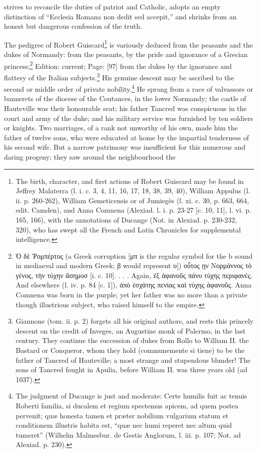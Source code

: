 {strives to reconcile the duties of patriot and Catholic, adopts an empty distinction of \texthebrew{“}Ecclesia Romana non dedit sed accepit,\texthebrew{}” and shrinks from an honest but dangerous confession of the truth.}

The pedigree of Robert Guiscard\footnote{The birth, character, and first actions of Robert Guiscard may be found in Jeffrey Malaterra (l. i. c. 3, 4, 11, 16, 17, 18, 38, 39, 40), William Appulus (l. ii. p. 260-262), William Gemeticensis or of Jumiegès (l. xi. c. 30, p. 663, 664, edit. Camden), and Anna Comnena (Alexiad. l. i. p. 23-27 [c. 10, 11], l. vi. p. 165, 166), with the annotations of Ducange (Not. in Alexiad. p. 230-232, 320), who has swept all the French and Latin Chronicles for supplemental intelligence.} is variously deduced from the peasants and the dukes of Normandy: from the peasants, by the pride and ignorance of a Grecian princess;\footnote{\textgreek{\texthebrew{Ὁ} δ\texthebrew{ὲ Ῥ}ομπέρτος} (a Greek corruption [\textgreek{μπ} is the regular symbol for the b sound in mediaeval and modern Greek; \textgreek{β} would represent \textgreek{υ}]) \textgreek{ο\texthebrew{ὖ}τος \texthebrew{ῃ}ν Νορμάννος τ\texthebrew{ὸ} γένος, τ\texthebrew{ὴ}ν τύχην \texthebrew{ἄ}σημοσ} [i. c. 10]. . . . Again, \textgreek{\texthebrew{ἐ}ξ \texthebrew{ἀ}φανο\texthebrew{ῦ}ς πάνυ τύχης περιφανές}. And elsewhere (l. iv. p. 84 [c. 1]), \textgreek{\texthebrew{ἀ}π\texthebrew{ὸ ἐ}σχάτης πενίας κα\texthebrew{ὶ} τύχης \texthebrew{ἀ}φανο\texthebrew{ῦ}ς}. Anna Comnena was born in the purple; yet her father was no more than a private though illustrious subject, who raised himself to the empire.} Edition: current; Page: [97] from the dukes by the ignorance and flattery of the Italian subjects.\footnote{Giannone (tom. ii. p. 2) forgets all his original authors, and rests this princely descent on the credit of Inveges, an Augustine monk of Palermo, in the last century. They continue the succession of dukes from Rollo to William II. the Bastard or Conqueror, whom they hold (communemente si tiene) to be the father of Tancred of Hauteville; a most strange and stupendous blunder! The sons of Tancred fought in Apulia, before William II. was three years old (ad 1037).} His genuine descent may be ascribed to the second or middle order of private nobility.\footnote{The judgment of Ducange is just and moderate: Certe humilis fuit ac tenuis Roberti familia, si ducalem et regium spectemus apicem, ad quem postea pervenit; quæ honesta tamen et præter nobilium vulgarium statum et conditionem illustris habita est, \texthebrew{“}quæ nec humi reperet nec altum quid tumeret\texthebrew{}” (Wilhelm Malmesbur. de Gestis Anglorum, l. iii. p. 107; Not. ad Alexiad. p. 230).} He sprang from a race of valvassors or bannerets of the diocese of the Coutances, in the lower Normandy; the castle of Hauteville was their honourable seat; his father Tancred was conspicuous in the court and army of the duke; and his military service was furnished by ten soldiers or knights. Two marriages, of a rank not unworthy of his own, made him the father of twelve sons, who were educated at home by the impartial tenderness of his second wife. But a narrow patrimony was insufficient for this numerous and daring progeny; they saw around the neighbourhood the 